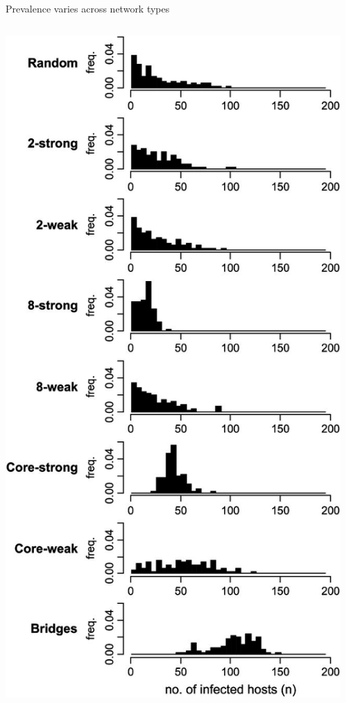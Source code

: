 \documentclass{beamer}
\begin{document}
\begin{frame}{Prevalence varies across network types}
\begin{columns}
\begin{column}{0.5\textwidth}
      \includegraphics[width=\textwidth, trim=0 23cm 0 0, clip]{F2}
    \end{column}
    \begin{column}{0.5\textwidth}
      \vspace{0.5cm}

\end{column}
\end{columns}
\end{frame}
\end{document}
